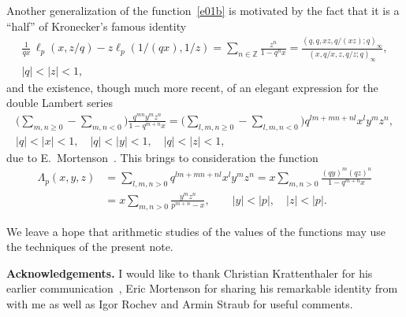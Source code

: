 \documentclass[12pt,reqno]{amsart}
\theoremstyle{remark}
\begin{document}
Another generalization of the function~\eqref{e01b} is motivated by the fact that it is a ``half'' of Kronecker's famous identity
\begin{gather*}
\frac1{qx}\,\ell_p(x,z/q)-z\ell_p(1/(qx),1/z)
=\sum_{n\in\mathbb Z}\frac{z^n}{1-q^nx}
=\frac{(q,q,xz,q/(xz);q)_\infty}{(x,q/x,z,q/z;q)_\infty},
\\
|q|<|z|<1,
\end{gather*}
and the existence, though much more recent, of an elegant expression for the double Lambert series
\begin{gather*}
\biggl(\sum_{m,n\ge0}-\sum_{m,n<0}\biggr)\frac{q^{mn}y^mz^n}{1-q^{m+n}x}
=\biggl(\sum_{l,m,n\ge0}-\sum_{l,m,n<0}\biggr)q^{lm+mn+nl}x^ly^mz^n,
\\
|q|<|x|<1, \quad |q|<|y|<1, \quad |q|<|z|<1,
\end{gather*}
due to E.~Mortenson~\cite{Mo16}. This brings to consideration the function
\begin{align*}
\Lambda_p(x,y,z)
&=\sum_{l,m,n>0}q^{lm+mn+nl}x^ly^mz^n
=x\sum_{m,n>0}\frac{(qy)^m(qz)^n}{1-q^{m+n}x}
\\
&=x\sum_{m,n>0}\frac{y^mz^n}{p^{m+n}-x},
\qquad |y|<|p|, \quad |z|<|p|.
\end{align*}

We leave a hope that arithmetic studies of the values of the functions may use the techniques of the present note.

\medskip
\noindent
\textbf{Acknowledgements.}
I would like to thank Christian Krattenthaler for his earlier communication~\cite{Kr06}, Eric Mortenson for sharing his
remarkable identity from~\cite{Mo16} with me as well as Igor Rochev and Armin Straub for useful comments.
\end{document}

